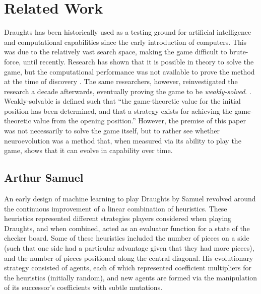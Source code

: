 \documentclass[12pt,a4paper]{article}
\begin{document}
\section{Related Work}

        Draughts has been historically used as a testing ground for artificial intelligence and computational capabilities since the early introduction of computers. This was due to the relatively vast search space, making the game difficult to brute-force, until recently. Research has shown that it is possible in theory to solve the game, but the computational performance was not available to prove the method at the time of discovery \cite{schaeffer_solving_1996}. The same researchers, however, reinvestigated the research a decade afterwards, eventually proving the game to be \emph{weakly-solved}. \cite{schaeffer_checkers_2007}. Weakly-solvable is defined such that ``the game-theoretic value for the initial position has been determined, and that a strategy exists for achieving the game-theoretic value from the opening position.'' \cite{allis_searching_1994} However, the premise of this paper was not necessarily to solve the game itself, but to rather see whether neuroevolution was a method that, when measured via its ability to play the game, shows that it can evolve in capability over time.


    \subsection{Arthur Samuel}
        An early design of machine learning to play Draughts by Samuel \cite{samuel_studies_1959} revolved around the continuous improvement of a linear combination of heuristics. These heuristics represented different strategies players considered when playing Draughts, and when combined, acted as an evaluator function for a state of the checker board. Some of these heuristics included the number of pieces on a  side (such that one side had a particular advantage given that they had more pieces), and the number of pieces positioned along the central diagonal. His evolutionary strategy consisted of agents, each of which represented coefficient multipliers for the heuristics (initially random), and new agents are formed via the manipulation of its successor's coefficients with subtle mutations.
        
\end{document}
